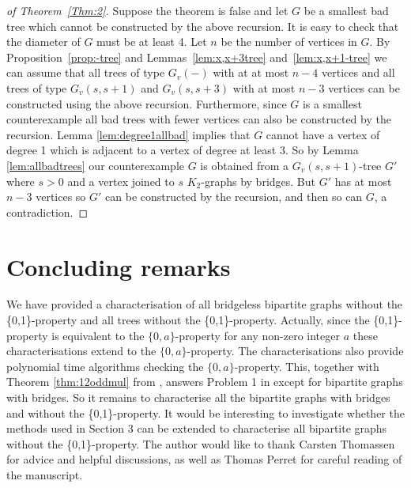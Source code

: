 \documentclass[
final,
 nomarks,
]{dmtcs-episciences}
\theoremstyle{definition}
\begin{document}
\begin{proof} [of Theorem~\ref{Thm:2}]
Suppose the theorem is false and let $G$ be a smallest bad tree which cannot be constructed by the above recursion.
It is easy to check that the diameter of $G$ must be at least 4. Let $n$ be the number of vertices in $G$. By Proposition~\ref{prop:-tree} and Lemmas~\ref{lem:x,x+3tree} and~\ref{lem:x,x+1-tree} we can assume that all trees of type $G_v(-)$ with at at most $n-4$ vertices and all trees of type $G_v(s,s+1)$ and $G_v(s,s+3)$ with at most $n-3$ vertices can be constructed using the above recursion. Furthermore, since $G$ is a smallest counterexample all bad trees with fewer vertices can also be constructed by the recursion. Lemma \ref{lem:degree1allbad} implies that $G$ cannot have a vertex of degree 1 which is adjacent to a vertex of degree at least 3. So by Lemma \ref{lem:allbadtrees} our counterexample $G$ is obtained from a $G_v(s,s+1)$-tree $G'$ where $s>0$ and a vertex joined to $s$ $K_2$-graphs by bridges. But $G'$ has at most $n-3$ vertices so $G'$ can be constructed by the recursion, and then so can $G$, a contradiction.
\end{proof}
\section{Concluding remarks}
We have provided a characterisation of all bridgeless bipartite graphs without the \{0,1\}-property and all trees without the \{0,1\}-property. Actually, since the \{0,1\}-property is equivalent to the $\{0,a\}$-property for any non-zero integer $a$ these characterisations extend to the $\{0,a\}$-property. The characterisations also provide polynomial time algorithms checking the $\{0,a\}$-property. This, together with Theorem \ref{thm:12oddmul} from \cite{TWZ}, answers Problem 1 in \cite{Lu} except for bipartite graphs with bridges. So it remains to characterise all the bipartite graphs with bridges and without the \{0,1\}-property. It would be interesting to investigate whether the methods used in Section 3 can be extended to characterise all bipartite graphs without the \{0,1\}-property.
\acknowledgements
\label{sec:ack}
The author would like to thank Carsten Thomassen for advice and helpful discussions, as well as Thomas Perret for careful reading of the manuscript.

\nocite{*}



%

\label{sec:biblio}
\end{document}
